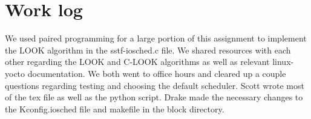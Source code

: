 \documentclass[letterpaper,10pt,notitlepage,fleqn]{article}
\begin{document}
\section{Work log}
We used paired programming for a large portion of this assignment to implement the LOOK algorithm in the sstf-iosched.c file. We shared resources with each other regarding the LOOK and C-LOOK algorithms as well as relevant linux-yocto documentation. We both went to office hours and cleared up a couple questions regarding testing and choosing the default scheduler. Scott wrote most of the tex file as well as the python script. Drake made the necessary changes to the Kconfig.iosched file and makefile in the block directory.
\end{document}
